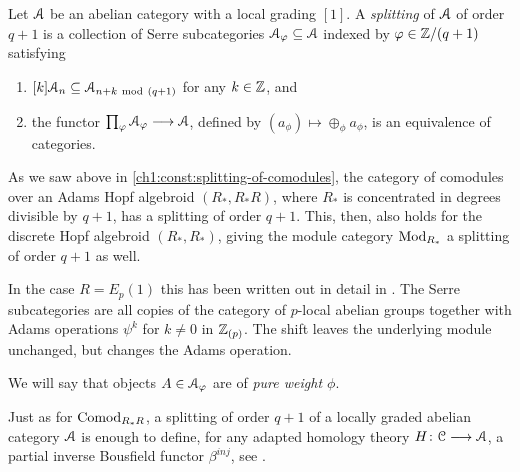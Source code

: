 \begin{definition}
    \label{ch1:def:splitting-of-abelian-category}
    Let $\EuScript{A}$ be an abelian category with a local grading $[1]$. A \emph{splitting} of $\EuScript{A}$ of order $q+1$ is a collection of Serre subcategories $\EuScript{A}_\varphi \subseteq \EuScript{A}$ indexed by $\varphi \in \mathbb{Z}/(q+1)$ satisfying
    \begin{enumerate}
        \item $[k]\EuScript{A}_n \subseteq \EuScript{A}_{n+k ~\mathrm{mod}~ (q+1)}$ for any $k\in \mathbb{Z}$, and 
        \item the functor $\prod_{\varphi}\EuScript{A}_\varphi\longrightarrow \EuScript{A}$, defined by $(a_\phi)\mapsto \oplus_\phi a_\phi$, is an equivalence of categories. 
    \end{enumerate}
\end{definition}
    
\begin{example}
    \label{ch1:ex:splitting-modules}
    As we saw above in \cref{ch1:const:splitting-of-comodules}, the category of comodules over an Adams Hopf algebroid $(R_*, R_*R)$, where $R_*$ is concentrated in degrees divisible by $q+1$, has a splitting of order $q+1$. This, then, also holds for the discrete Hopf algebroid $(R_*, R_*)$, giving the module category $\mathrm{Mod}_{R_*}$ a splitting of order $q+1$ as well. 
\end{example}

\begin{example}
    In the case $R=E_p(1)$ this has been written out in detail in \cite[Section 4]{barnes-roitzheim_2011}. The Serre subcategories are all copies of the category of $p$-local abelian groups together with Adams operations $\psi^k$ for $k\neq 0$ in $\mathbb{Z}_{(p)}$. The shift leaves the underlying module unchanged, but changes the Adams operation. 
\end{example}
    
\begin{definition}
    \label{ch1:not:pure-weight}
    We will say that objects $A\in \EuScript{A}_\varphi$ are of \emph{pure weight $\phi$}. 
\end{definition}
    
\begin{remark}
    Just as for $\mathrm{Comod}_{R_*R}$, a splitting of order $q+1$ of a locally graded abelian category $\EuScript{A}$ is enough to define, for any adapted homology theory $H\colon \EuScript{C}\longrightarrow \EuScript{A}$, a partial inverse Bousfield functor $\beta^{inj}$, see \cite[Section 7.2]{patchkoria-pstragowski_2021}. 
\end{remark}




